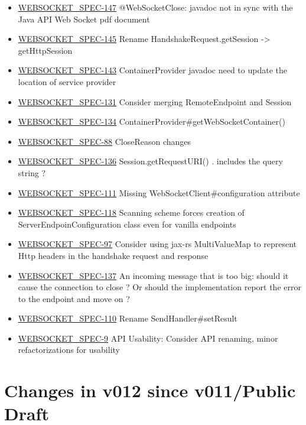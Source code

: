 \begin{itemize}
\item \href {http://java.net/jira/browse/WEBSOCKET_SPEC-147}{WEBSOCKET\_SPEC-147} @WebSocketClose: javadoc not in sync with the Java API Web Socket pdf document
\item \href {http://java.net/jira/browse/WEBSOCKET_SPEC-145}{WEBSOCKET\_SPEC-145} Rename HandshakeRequest.getSession -> getHttpSession
\item \href {http://java.net/jira/browse/WEBSOCKET_SPEC-143}{WEBSOCKET\_SPEC-143} ContainerProvider javadoc need to update the location of service provider
\item \href {http://java.net/jira/browse/WEBSOCKET_SPEC-131}{WEBSOCKET\_SPEC-131} Consider merging RemoteEndpoint and Session
\item \href {http://java.net/jira/browse/WEBSOCKET_SPEC-134}{WEBSOCKET\_SPEC-134} ContainerProvider\#getWebSocketContainer()
\item \href {http://java.net/jira/browse/WEBSOCKET_SPEC-88}{WEBSOCKET\_SPEC-88} CloseReason changes
\item \href {http://java.net/jira/browse/WEBSOCKET_SPEC-136}{WEBSOCKET\_SPEC-136} Session.getRequestURI() . includes the query string ?
\item \href {http://java.net/jira/browse/WEBSOCKET_SPEC-111}{WEBSOCKET\_SPEC-111} Missing WebSocketClient\#configuration attribute
\item \href {http://java.net/jira/browse/WEBSOCKET_SPEC-118}{WEBSOCKET\_SPEC-118} Scanning scheme forces creation of ServerEndpoinConfiguration class even for vanilla endpoints
\item \href {http://java.net/jira/browse/WEBSOCKET_SPEC-97}{WEBSOCKET\_SPEC-97} Consider using jax-rs MultiValueMap to represent Http headers in the handshake request and response
\item \href {http://java.net/jira/browse/WEBSOCKET_SPEC-137}{WEBSOCKET\_SPEC-137} An incoming message that is too big: should it cause the connection to close ? Or should the implementation report the error to the endpoint and move on ?
\item \href {http://java.net/jira/browse/WEBSOCKET_SPEC-110}{WEBSOCKET\_SPEC-110} Rename SendHandler\#setResult
\item \href {http://java.net/jira/browse/WEBSOCKET_SPEC-9}{WEBSOCKET\_SPEC-9} API Usability: Consider API renaming, minor refactorizations for usability
\end{itemize}

\section*{Changes in v012 since v011/Public Draft}

